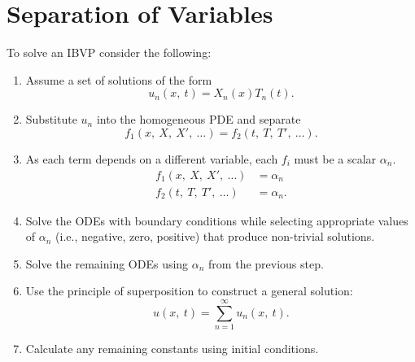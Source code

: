 \documentclass{article}
\begin{document}
\section{Separation of Variables}
To solve an IBVP consider the following:
\begin{enumerate}
    \item Assume a set of solutions of the form
          \begin{equation*}
              u_n\left( x,\: t \right) = X_n\left( x \right) T_n\left( t \right).
          \end{equation*}
    \item Substitute \(u_n\) into the homogeneous PDE and separate
          \begin{equation*}
              f_1\left( x,\: X,\: X',\: \dots \right) = f_2\left( t,\: T,\: T',\: \dots \right).
          \end{equation*}
    \item As each term depends on a different variable,
          each \(f_i\) must be a scalar \(\alpha_n\).
          \begin{align*}
              f_1\left( x,\: X,\: X',\: \dots \right) & = \alpha_n  \\
              f_2\left( t,\: T,\: T',\: \dots \right) & = \alpha_n.
          \end{align*}
    \item Solve the ODEs with boundary conditions while selecting appropriate values of \(\alpha_n\) (i.e., negative, zero, positive) that produce non-trivial solutions.
    \item Solve the remaining ODEs using \(\alpha_n\) from the previous step.
    \item Use the principle of superposition to construct a general solution:
          \begin{equation*}
              u\left( x,\: t \right) = \sum_{n = 1}^\infty u_n\left( x,\: t \right).
          \end{equation*}
    \item Calculate any remaining constants using initial conditions.
\end{enumerate}
\end{document}
